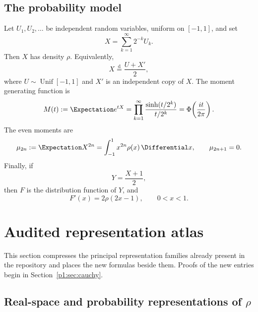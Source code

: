 \documentclass[11pt]{article}
\theoremstyle{definition}
\theoremstyle{remark}
\begin{document}
\subsection{The probability model}

Let \(U_1,U_2,\dots\) be independent random variables, uniform on \([-1,1]\), and set
\begin{equation}
 X=\sum_{k=1}^{\infty}2^{-k}U_k.                              \label{p1:eq:X-series}
\end{equation}
Then \(X\) has density \(\rho\).  Equivalently,
\begin{equation}
 X\overset{\mathrm d}=\frac{U+X'}2,                           \label{p1:eq:X-fixed-point}
\end{equation}
where \(U\sim\operatorname{Unif}[-1,1]\) and \(X'\) is an independent copy of \(X\).
The moment generating function is
\begin{equation}
 M(t):=\Expectation e^{tX}
 =\prod_{k=1}^{\infty}\frac{\sinh(t/2^k)}{t/2^k}
 =\Phi\!\left(\frac{it}{2\pi}\right).                       \label{p1:eq:M-product}
\end{equation}
The even moments are
\begin{equation}
 \mu_{2n}:=\Expectation X^{2n}=\int_{-1}^{1}x^{2n}\rho(x)\,\Differential x,
 \qquad \mu_{2n+1}=0.                                      \label{p1:eq:moments}
\end{equation}
Finally, if
\begin{equation}
 Y=\frac{X+1}{2},                                             \label{p1:eq:Y-affine}
\end{equation}
then \(F\) is the distribution function of \(Y\), and
\begin{equation}
 F'(x)=2\rho(2x-1),\qquad 0<x<1.                              \label{p1:eq:F-density}
\end{equation}

\section{Audited representation atlas}

This section compresses the principal representation families already present in the
repository and places the new formulas beside them.  Proofs of the new entries begin in
Section~\ref{p1:sec:cauchy}.

\subsection[Real-space and probability representations of rho]{Real-space and probability representations of \(\rho\)}
\end{document}
